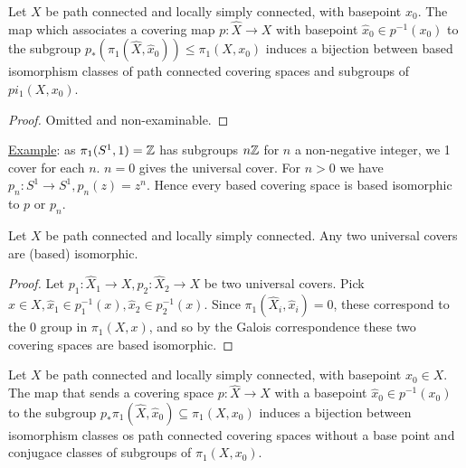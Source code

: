 \documentclass[10pt,a4paper]{article}
\begin{document}
\begin{theorem}
Let $X$ be path connected and locally simply connected, with basepoint $x_0$. The map which associates a covering map $p:\hat{X} \to X$ with basepoint $\hat{x}_0 \in p^{-1}(x_0)$ to the subgroup $p_\ast(\pi_1(\hat{X},\hat{x}_0)) \leq \pi_1(X,x_0)$ induces a bijection between based isomorphism classes of path connected covering spaces and subgroups of $pi_1(X,x_0)$.
\end{theorem}
\begin{proof}
Omitted and non-examinable.
\end{proof}
\underline{Example}: as $\pi_1(S^1, 1) = \mathbb{Z}$ has subgroups $n\mathbb{Z}$ for $n$ a non-negative integer, we 1 cover for each $n$. $n=0$ gives the universal cover. For $n>0$ we have $p_n:S^1 \to S^1, p_n(z)=z^n$. Hence every based covering space is based isomorphic to $p$ or $p_n$.
\begin{corollary}
Let $X$ be path connected and locally simply connected. Any two universal covers are (based) isomorphic.
\end{corollary}
\begin{proof}
Let $p_1:\hat{X}_1 \to X, p_2:\hat{X}_2 \to X$ be two universal covers. Pick $x \in X, \hat{x}_1 \in p_1^{-1}(x), \hat{x}_2 \in p_2^{-1}(x)$. Since $\pi_1(\hat{X}_i, \hat{x}_i) = 0$, these correspond to the $0$ group in $\pi_1(X,x)$, and so by the Galois correspondence these two covering spaces are based isomorphic.
\end{proof}
\begin{corollary}
Let $X$ be path connected and locally simply connected, with basepoint $x_0 \in X$. The map that sends a covering space $p:\hat{X} \to X$ with a basepoint $\hat{x}_0 \in p^{-1}(x_0)$ to the subgroup $p_\ast \pi_1(\hat{X}, \hat{x}_0) \subseteq \pi_1(X,x_0)$ induces a bijection between isomorphism classes os path connected covering spaces without a base point and conjugace classes of subgroups of $\pi_1(X,x_0)$.
\end{corollary}
\end{document}
